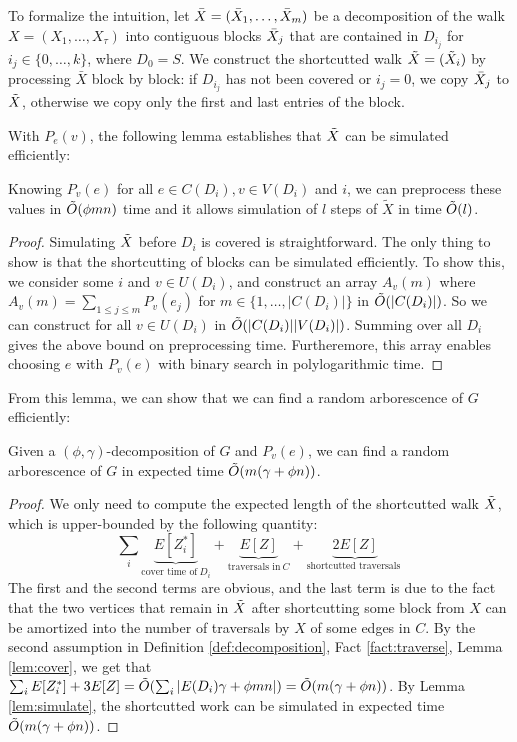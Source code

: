 To formalize the intuition, let $\bar{X}=(\Bar{X}_1, \dots, \Bar{X}_m)$ be a decomposition of the walk $X=(X_1, \dots, X_\tau)$ into contiguous blocks $\Bar{X}_j$ that are contained in $D_{i_j}$ for $i_j \in \{0, \dots, k\}$, where $D_0=S$.
We construct the shortcutted walk $\Tilde{X}=(\Tilde{X}_i)$ by processing $\bar{X}$ block by block: 
if $D_{i_j}$ has not been covered or $i_j=0$, we copy $\Bar{X}_j$ to $\Tilde{X}$, otherwise we copy only the first and last entries of the block.

With $P_e(v)$, the following lemma establishes that $\Tilde{X}$ can be simulated efficiently:
\begin{lemma}
\label{lem:simulate}
        Knowing $P_v(e)$ for all $e \in C(D_i), v \in V(D_i)$ and $i$, we can preprocess these values in $\tilde{O}(\phi mn)$ time and it allows simulation of $l$ steps of $\tilde{X}$ in time $\tilde{O}(l)$.
\end{lemma}
\begin{proof}
    Simulating $\Tilde{X}$ before $D_i$ is covered is straightforward. The only thing to show is that the shortcutting of blocks can be simulated efficiently. To show this, we consider some $i$ and $v \in U(D_i)$, and construct an array $A_v(m)$ where $A_v(m) = \sum_
{1\leq j \leq m} P_v(e_j)$ for $m \in \{1, \dots, |C(D_i)|\}$ in $\tilde{O}(|C(D_i)|)$. So we can construct for all $v \in U(D_i)$ in $\tilde{O}(|C(D_i)||V(D_i)|)$. Summing over all $D_i$ gives the above bound on preprocessing time.
Furtheremore, this array enables choosing $e$ with $P_v(e)$ with binary search in polylogarithmic time. 
\end{proof}

From this lemma, we can show that we can find a random arborescence of $G$ efficiently:
\begin{lemma}
\label{lem:find_abr}
        Given a $(\phi, \gamma)$-decomposition of $G$ and $P_v(e)$, we can find a random arborescence of $G$ in expected time $\tilde{O}(m(\gamma+\phi n))$.
\end{lemma}
\begin{proof}
    We only need to compute the expected length of the shortcutted walk $\Tilde{X}$, which is upper-bounded by the following quantity:
    $$\sum_i \underbrace{E[Z_i^*]}_{\text{cover time of}~D_i} + \underbrace{E[Z]}_{\text{traversals in}~C} + \underbrace{2E[Z]}_{\text{shortcutted traversals }}$$
    The first and the second terms are obvious, and the last term is due to the fact that the two vertices that remain in $\Tilde{X}$ after shortcutting some block from $X$ can be amortized into the number of traversals by $X$ of some edges in $C$.
    By the second assumption in Definition \ref{def:decomposition}, Fact \ref{fact:traverse}, Lemma \ref{lem:cover}, we get that $\sum_i E[Z_i^*] + 3 E[Z] =\tilde{O}(\sum_i |E(D_i)\gamma + \phi mn|) = \tilde{O}(m(\gamma + \phi n))$. By Lemma \ref{lem:simulate}, the shortcutted work can be simulated in expected time $\tilde{O}(m(\gamma + \phi n))$.
\end{proof}


